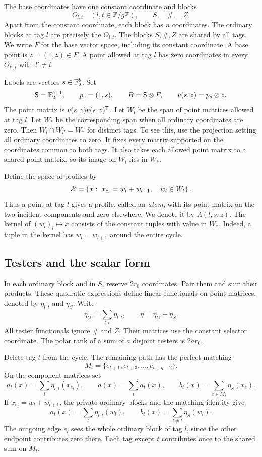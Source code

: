 The base coordinates have one constant coordinate and blocks
\[
 O_{l,t}\quad(l,t\in\mathbb Z/g\mathbb Z),\qquad S,\quad \#,\quad Z.
\]
Apart from the constant coordinate, each block has \(n\) coordinates. The ordinary blocks at tag \(l\) are precisely the \(O_{l,t}\).
The blocks \(S,\#,Z\) are shared by all tags.
We write \(F\) for the base vector space, including its constant coordinate.
A base point is \(\bar z=(1,z)\in F\). A point allowed at tag \(l\)
has zero coordinates in every \(O_{l',t}\) with \(l'\ne l\).

Labels are vectors \(s\in\mathbb F_2^b\). Set
\[
 \mathsf S=\mathbb F_2^{b+1},\qquad p_s=(1,s),\qquad
 B=\mathsf S\otimes F,\qquad v(s,z)=p_s\otimes\bar z.
\]
The point matrix is \(v(s,z)v(s,z)^{\mathsf T}\).
Let \(W_l\) be the span of point matrices allowed at tag \(l\).
Let \(W_*\) be the corresponding span when all ordinary coordinates are
zero. Then \(W_l\cap W_{l'}=W_*\) for distinct tags. To see this, use
the projection setting all ordinary coordinates to zero. It fixes
every matrix supported on the coordinates common to both tags. It also
takes each allowed point matrix to a shared point matrix, so its image on
\(W_l\) lies in \(W_*\).

Define the space of profiles by
\[
 \mathcal X=\left\{x:\ x_{e_l}=w_l+w_{l+1},\quad w_l\in W_l\right\}.
\]
Thus a point at tag \(l\) gives a profile, called an \emph{atom}, with its
point matrix on the two incident components and zero elsewhere.
We denote it by \(A(l,s,z)\). The kernel of \((w_l)_l\mapsto x\)
consists of the constant tuples with value in \(W_*\). Indeed, a tuple
in the kernel has \(w_l=w_{l+1}\) around the entire cycle.

\subsection{Testers and the scalar form}

In each ordinary block and in \(S\), reserve \(2r_0\) coordinates.
Pair them and sum their products. These quadratic expressions define linear
functionals on point matrices, denoted by \(\eta_{l,t}\) and \(\eta_S\).
Write
\[
 \eta_O=\sum_{l,t}\eta_{l,t},\qquad \eta=\eta_O+\eta_S.
\]
All tester functionals ignore \(\#\) and \(Z\). Their matrices use the
constant selector coordinate. The polar rank of a sum of \(a\) disjoint
testers is \(2ar_0\).

Delete tag \(t\) from the cycle. The remaining path has the perfect matching
\[
 M_t=\{e_{t+1},e_{t+3},\ldots,e_{t+g-2}\}.
\]
On the component matrices set
\begin{equation}\label{eq:cycle-functionals}
 a_t(x)=\sum_l\eta_{l,t}(x_{e_l}),\qquad
 a(x)=\sum_ta_t(x),\qquad
 b_t(x)=\sum_{e\in M_t}\eta_S(x_e).
\end{equation}
If \(x_{e_l}=w_l+w_{l+1}\), the private ordinary blocks and the matching
identity give
\[
 a_t(x)=\sum_l\eta_{l,t}(w_l),\qquad
 b_t(x)=\sum_{l\ne t}\eta_S(w_l).
\]
The outgoing edge \(e_l\) sees the whole ordinary block of tag \(l\),
since the other endpoint contributes zero there. Each tag except \(t\)
contributes once to the shared sum on \(M_t\).

